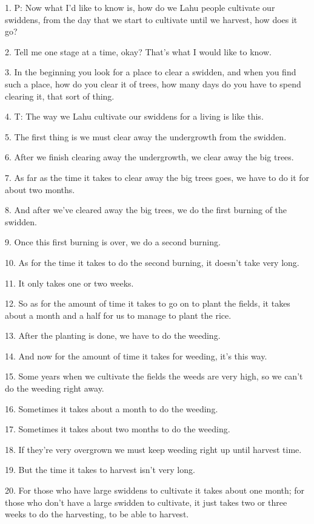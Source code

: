 \setcounter{footnote}{0}

1. P: Now what I'd like to know is, how do we Lahu people cultivate our swiddens,
from the day that we start to cultivate until we harvest, how does it go?

2. Tell me one stage at a time, okay? That's what I would like to know.

3. In the beginning you look for a place to clear a swidden, and when you find such
a place, how do you clear it of trees, how many days do you have to spend clearing
it, that sort of thing.

4. T: The way we Lahu cultivate our swiddens for a living is like this.

5. The first thing is we must clear away the undergrowth from the swidden.

6. After we finish clearing away the undergrowth, we clear away the big trees.

7. As far as the time it takes to clear away the big trees goes, we have to do it
for about two months.

8. And after we've cleared away the big trees, we do the first burning of the swidden.

9. Once this first burning is over, we do a second burning.

10. As for the time it takes to do the second burning, it doesn't take very long.

11. It only takes one or two weeks.

12. So as for the amount of time it takes to go on to plant the fields, it takes
about a month and a half for us to manage to plant the rice.

13. After the planting is done, we have to do the weeding.

14. And now for the amount of time it takes for weeding, it's this way.

15. Some years when we cultivate the fields the weeds are very high, so we can't
do the weeding right away.

16. Sometimes it takes about a month to do the weeding.

17. Sometimes it takes about two months to do the weeding.

18. If they're very overgrown we must keep weeding right up until harvest time.

19. But the time it takes to harvest isn't very long.

20. For those who have large swiddens to cultivate it takes about one month; for
those who don't have a large swidden to cultivate, it just takes two or three weeks
to do the harvesting, to be able to harvest.

